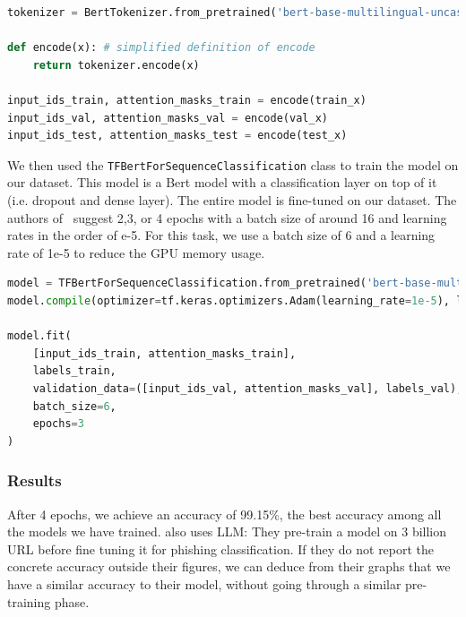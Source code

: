 \documentclass{article}
\begin{document}
    \begin{lstlisting}[language=Python, caption=Tokenizing using Bert]
tokenizer = BertTokenizer.from_pretrained('bert-base-multilingual-uncased')

def encode(x): # simplified definition of encode
    return tokenizer.encode(x)

input_ids_train, attention_masks_train = encode(train_x)
input_ids_val, attention_masks_val = encode(val_x)
input_ids_test, attention_masks_test = encode(test_x)
    \end{lstlisting}

    We then used the \texttt{TFBertForSequenceClassification} class to train the model on our dataset.
    This model is a Bert model with a classification layer on top of it (i.e. dropout and dense layer).
    The entire model is fine-tuned on our dataset.
    The authors of~\cite{devlin2018bert} suggest 2,3, or 4 epochs with a batch size of around 16 and learning rates in the order of e-5.
    For this task, we use a batch size of 6 and a learning rate of 1e-5 to reduce the GPU memory usage.

    \begin{lstlisting}[language=Python, caption=Fine tuning Bert]
model = TFBertForSequenceClassification.from_pretrained('bert-base-multilingual-uncased')
model.compile(optimizer=tf.keras.optimizers.Adam(learning_rate=1e-5), loss=tf.keras.losses.SparseCategoricalCrossentropy(from_logits=True), metrics="accuracy")

model.fit(
    [input_ids_train, attention_masks_train],
    labels_train,
    validation_data=([input_ids_val, attention_masks_val], labels_val),
    batch_size=6,
    epochs=3
)
    \end{lstlisting}

    \subsubsection{Results}

    After 4 epochs, we achieve an accuracy of 99.15\%, the best accuracy among all the models we have trained.
    \cite{PhishBert} also uses LLM: They pre-train a model on 3 billion URL before fine tuning it for phishing classification.
    If they do not report the concrete accuracy outside their figures, we can deduce from their graphs that we have a similar accuracy to their model, without going through a similar pre-training phase.
\end{document}
